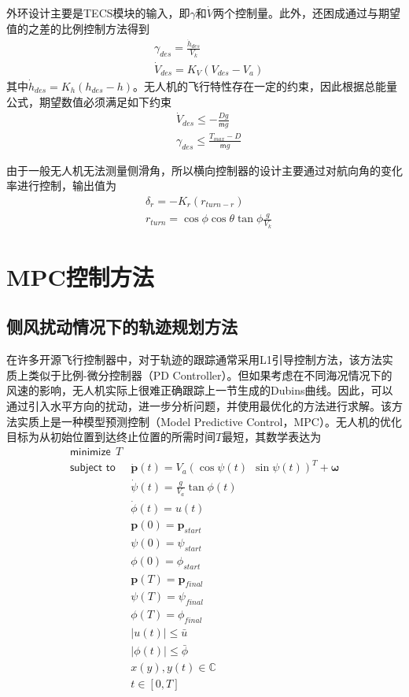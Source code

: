 外环设计主要是TECS模块的输入，即$\gamma$和$\dot{V}$两个控制量。此外，还困成通过与期望值的之差的比例控制方法得到
\begin{align}
&\gamma_{des} = \frac{\dot{h}_{des}}{V_k} \\
&\dot{V}_{des} = K_V(V_{des}-V_a) 
\end{align}
其中$\dot{h}_{des} = K_h(h_{des}-h)$。无人机的飞行特性存在一定的约束，因此根据总能量公式，期望数值必须满足如下约束
\begin{align}
&\dot{V} _{des} \le -\frac{Dg}{\mathsf{m}g} \\
&\gamma_{des} \le \frac{T_{max} - D}{\mathsf{m}g}
\end{align}

由于一般无人机无法测量侧滑角，所以横向控制器的设计主要通过对航向角的变化率进行控制，输出值为
\begin{align}
&\delta_r = -K_r (r_{turn - r}) \\
&r_{turn} = \cos \phi \cos \theta \tan \phi \frac{g}{V_k}
\end{align}

\section{MPC控制方法}

\subsection{侧风扰动情况下的轨迹规划方法}
在许多开源飞行控制器中，对于轨迹的跟踪通常采用L1引导控制方法，该方法实质上类似于比例-微分控制器（PD Controller）。但如果考虑在不同海况情况下的风速的影响，无人机实际上很难正确跟踪上一节生成的Dubins曲线。因此，可以通过引入水平方向的扰动，进一步分析问题，并使用最优化的方法进行求解。该方法实质上是一种模型预测控制（Model Predictive Control，MPC）。无人机的优化目标为从初始位置到达终止位置的所需时间$T$最短，其数学表达为 
\begin{align}
\textsf{minimize}\ \ T \label{eq:gust_dubins_1} \\
\textsf{subject to}\  \ &\dot{\mathbf{p}}(t) = {V}_a(\cos \psi(t)\ \ \sin \psi(t))^T + \mathbf{\omega}  \nonumber \\
& \dot{\psi}(t) = \frac{g}{{V}_a} \tan \phi(t) \nonumber \\
& \dot{\phi}(t) = u(t) \nonumber \\
& \mathbf{p}(0) = \mathbf{p}_{start} \nonumber \\
& \psi(0) = \psi_{start} \nonumber \\
& \phi(0) = \phi_{start} \nonumber \\
& \mathbf{p}(T) = \mathbf{p}_{final} \nonumber \\
& \psi(T) = \psi_{final} \nonumber \\
& \phi(T) = \phi_{final} \nonumber \\
& |u(t)| \le \bar{u}  \nonumber \\
& |\phi(t)| \le \bar{\phi} \nonumber \\
& x(y), y(t) \in \mathbb{C} \nonumber \\
& t \in [0, T] \nonumber
\end{align}

